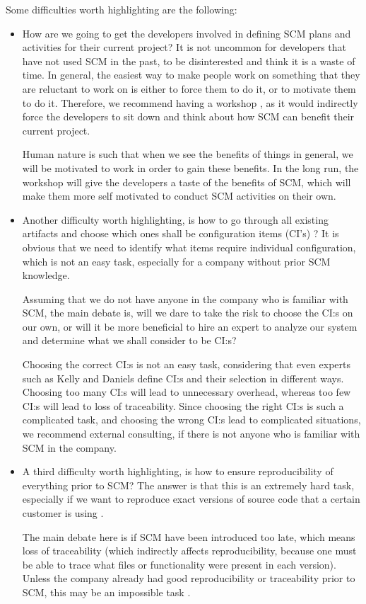 \documentclass[10pt]{article}
\begin{document}
Some difficulties worth highlighting are the following:
\begin{itemize}
\item How are we going to get the developers involved in defining SCM plans and activities for their current project? It is not uncommon for developers that have not used SCM in the past, to be disinterested and think it is a waste of time. In general, the easiest way to make people work on something that they are reluctant to work on is either to force them to do it, or to motivate them to do it. Therefore, we recommend having a workshop \cite{Vinter}, as it would indirectly force the developers to sit down and think about how SCM can benefit their current project. 

\noindent Human nature is such that when we see the benefits of things in general, we will be motivated to work in order to gain these benefits. In the long run, the workshop will give the developers a taste of the benefits of SCM, which will make them more self motivated to conduct SCM activities on their own. 

\item Another difficulty worth highlighting, is how to go through all existing artifacts and choose which ones shall be configuration items (CI's) \cite{Kelly2}? It is obvious that we need to identify what items require individual configuration, which is not an easy task, especially for a company without prior SCM knowledge. 

\noindent Assuming that we do not have anyone in the company who is familiar with SCM, the main debate is, will we dare to take the risk to choose the CI:s on our own, or will it be more beneficial to hire an expert to analyze our system and determine what we shall consider to be CI:s? 

Choosing the correct CI:s is not an easy task, considering that even experts such as Kelly\cite{Kelly2} and Daniels\cite{Daniels3} define CI:s and their selection in different ways. Choosing too many CI:s will lead to unnecessary overhead, whereas too few CI:s will lead to loss of traceability\cite{Daniels3}. Since choosing the right CI:s is such a complicated task\cite{Daniels3}\cite{Kelly2}, and choosing the wrong CI:s lead to complicated situations\cite{Daniels3}, we recommend external consulting, if there is not anyone who is familiar with SCM in the company.

\item A third difficulty worth highlighting, is how to ensure reproducibility of everything prior to SCM? The answer is that this is an extremely hard task, especially if we want to reproduce exact versions of source code that a certain customer is using \cite{Appleton2}.

\noindent The main debate here is if SCM have been introduced too late, which means loss of traceability \cite{Kelly} (which indirectly affects reproducibility, because one must be able to trace what files or functionality were present in each version). Unless the company already had good reproducibility or traceability prior to SCM, this may be an impossible task \cite{Bays}. 

\end{itemize}
\end{document}
